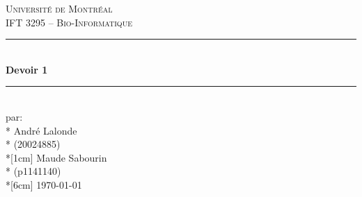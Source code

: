 \documentclass[11pt, letterpaper]{article}
\begin{document}
\begin{titlepage}
\center

\vspace*{2cm}

\textsc{\LARGE Université de Montréal}\\[1cm] 
\textsc{\Large IFT 3295 -- Bio-Informatique}\\[1.5cm] 

\rule{\linewidth}{0.5mm} \\[0.5cm]
{\LARGE \bfseries Devoir 1} \\[0.2cm] %
\rule{\linewidth}{0.5mm} \\[3cm]
 
\large par: \\*
André Lalonde \\* %
(20024885) \\*[1cm] %
Maude Sabourin \\*
(p1141140) \\*[6cm]
{\large \today}\\[2cm]

\vfill
\end{titlepage}
\newpage
\flushleft
\end{document}
